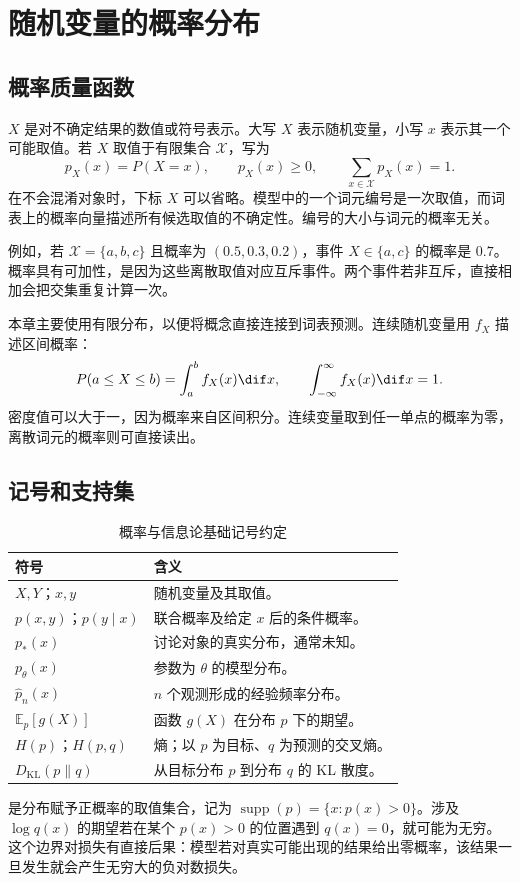 \documentclass[../textbook.tex]{subfiles}
\begin{document}
\section{随机变量的概率分布}

\subsection{概率质量函数}
 $X$ 是对不确定结果的数值或符号表示。大写 $X$ 表示随机变量，小写 $x$ 表示其一个可能取值。若 $X$ 取值于有限集合 $\mathcal X$，写为
\begin{equation}
 p_X(x)=P(X=x),\qquad p_X(x)\ge0,\qquad\sum_{x\in\mathcal X}p_X(x)=1.
\end{equation}
在不会混淆对象时，下标 $X$ 可以省略。模型中的一个词元编号是一次取值，而词表上的概率向量描述所有候选取值的不确定性。编号的大小与词元的概率无关。

例如，若 $\mathcal X=\{a,b,c\}$ 且概率为 $(0.5,0.3,0.2)$，事件 $X\in\{a,c\}$ 的概率是 $0.7$。概率具有可加性，是因为这些离散取值对应互斥事件。两个事件若非互斥，直接相加会把交集重复计算一次。

本章主要使用有限分布，以便将概念直接连接到词表预测。连续随机变量用 $f_X$ 描述区间概率：
\begin{equation}
 P(a\le X\le b)=\int_a^b f_X(x)\dif x,\qquad\int_{-\infty}^{\infty}f_X(x)\dif x=1.
\end{equation}
密度值可以大于一，因为概率来自区间积分。连续变量取到任一单点的概率为零，离散词元的概率则可直接读出。

\subsection{记号和支持集}
\begin{table}[htbp]
\centering
\caption{概率与信息论基础记号约定}\label{tab:prob-notations}
\begin{tabular}{ll}
\toprule 符号 & 含义\\\midrule
$X,Y$；$x,y$ & 随机变量及其取值。\\
$p(x,y)$；$p(y\mid x)$ & 联合概率及给定 $x$ 后的条件概率。\\
$p_*(x)$ & 讨论对象的真实分布，通常未知。\\
$p_\theta(x)$ & 参数为 $\theta$ 的模型分布。\\
$\widehat p_n(x)$ & $n$ 个观测形成的经验频率分布。\\
$\mathbb E_p[g(X)]$ & 函数 $g(X)$ 在分布 $p$ 下的期望。\\
$H(p)$；$H(p,q)$ & 熵；以 $p$ 为目标、$q$ 为预测的交叉熵。\\
$D_{\mathrm{KL}}(p\|q)$ & 从目标分布 $p$ 到分布 $q$ 的 KL 散度。\\
\bottomrule
\end{tabular}
\end{table}
是分布赋予正概率的取值集合，记为 $\operatorname{supp}(p)=\{x:p(x)>0\}$。涉及 $\log q(x)$ 的期望若在某个 $p(x)>0$ 的位置遇到 $q(x)=0$，就可能为无穷。这个边界对损失有直接后果：模型若对真实可能出现的结果给出零概率，该结果一旦发生就会产生无穷大的负对数损失。
\end{document}
